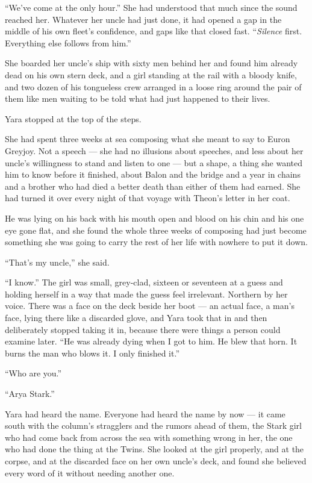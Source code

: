 “We’ve come at the only hour.” She had understood that much since the sound reached her. Whatever her uncle had just done, it had opened a gap in the middle of his own fleet’s confidence, and gaps like that closed fast. “\textit{Silence} first. Everything else follows from him.”

\sceneBreak

She boarded her uncle’s ship with sixty men behind her and found him already dead on his own stern deck, and a girl standing at the rail with a bloody knife, and two dozen of his tongueless crew arranged in a loose ring around the pair of them like men waiting to be told what had just happened to their lives.

Yara stopped at the top of the steps.

She had spent three weeks at sea composing what she meant to say to Euron Greyjoy. Not a speech — she had no illusions about speeches, and less about her uncle’s willingness to stand and listen to one — but a shape, a thing she wanted him to know before it finished, about Balon and the bridge and a year in chains and a brother who had died a better death than either of them had earned. She had turned it over every night of that voyage with Theon’s letter in her coat.

He was lying on his back with his mouth open and blood on his chin and his one eye gone flat, and she found the whole three weeks of composing had just become something she was going to carry the rest of her life with nowhere to put it down.

“That’s my uncle,” she said.

“I know.” The girl was small, grey-clad, sixteen or seventeen at a guess and holding herself in a way that made the guess feel irrelevant. Northern by her voice. There was a face on the deck beside her boot — an actual face, a man’s face, lying there like a discarded glove, and Yara took that in and then deliberately stopped taking it in, because there were things a person could examine later. “He was already dying when I got to him. He blew that horn. It burns the man who blows it. I only finished it.”

“Who are you.”

“Arya Stark.”

Yara had heard the name. Everyone had heard the name by now — it came south with the column’s stragglers and the rumors ahead of them, the Stark girl who had come back from across the sea with something wrong in her, the one who had done the thing at the Twins. She looked at the girl properly, and at the corpse, and at the discarded face on her own uncle’s deck, and found she believed every word of it without needing another one.

